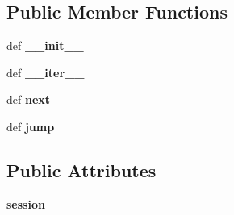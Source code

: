 \subsection*{Public Member Functions}
\begin{DoxyCompactItemize}
\item 
\hypertarget{classcheshire3_1_1base_store_1_1_bdb_iter_a2061796cd18f279859dd9c6017e0d68e}{def {\bfseries \-\_\-\-\_\-init\-\_\-\-\_\-}}\label{classcheshire3_1_1base_store_1_1_bdb_iter_a2061796cd18f279859dd9c6017e0d68e}

\item 
\hypertarget{classcheshire3_1_1base_store_1_1_bdb_iter_ae7ae1742698e2babcdc6c378800c4901}{def {\bfseries \-\_\-\-\_\-iter\-\_\-\-\_\-}}\label{classcheshire3_1_1base_store_1_1_bdb_iter_ae7ae1742698e2babcdc6c378800c4901}

\item 
\hypertarget{classcheshire3_1_1base_store_1_1_bdb_iter_aecd2a7bfa88da1179a92b396590cee46}{def {\bfseries next}}\label{classcheshire3_1_1base_store_1_1_bdb_iter_aecd2a7bfa88da1179a92b396590cee46}

\item 
\hypertarget{classcheshire3_1_1base_store_1_1_bdb_iter_a4c26b07f30183298d64c5e6eeb31aad2}{def {\bfseries jump}}\label{classcheshire3_1_1base_store_1_1_bdb_iter_a4c26b07f30183298d64c5e6eeb31aad2}

\end{DoxyCompactItemize}
\subsection*{Public Attributes}
\begin{DoxyCompactItemize}
\item 
\hypertarget{classcheshire3_1_1base_store_1_1_bdb_iter_a061b74622a37898395ef20ac74cbba52}{{\bfseries session}}\label{classcheshire3_1_1base_store_1_1_bdb_iter_a061b74622a37898395ef20ac74cbba52}

\end{DoxyCompactItemize}
